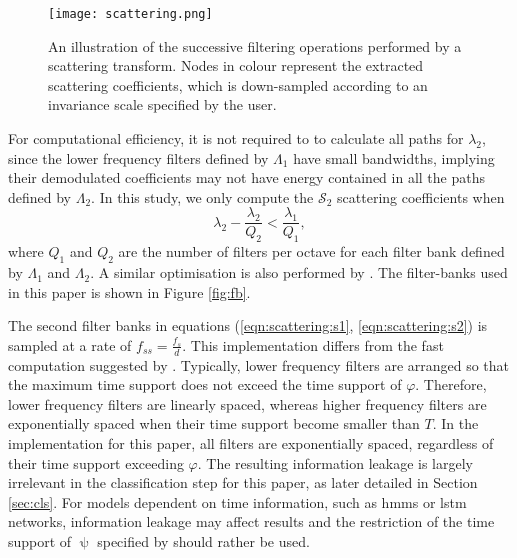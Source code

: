 {\begin{figure}[h]
    \centering
    \texttt{[image: scattering.png]}
    \caption{An illustration of the successive filtering operations performed by a scattering transform. Nodes in colour represent the extracted scattering coefficients, which is down-sampled according to an invariance scale specified by the user.}
    \label{fig:scattering}
\end{figure}

For computational efficiency, it is not required to to calculate all paths for $\lambda_2$, since the lower frequency filters defined by $\Lambda_1$ have small bandwidths, implying their demodulated coefficients may not have energy contained in all the paths defined by $\Lambda_2$. In this study, we only compute the $\mathcal{S}_2$ scattering coefficients when 
\begin{equation}
\label{eqn:restrictlambda2}
    \lambda_2 - \frac{\lambda_2}{Q_2} <  \frac{\lambda_1}{Q_1},
\end{equation}
where $Q_1$ and $Q_2$ are the number of filters per octave for each filter bank defined by $\Lambda_1$ and $\Lambda_2$. A similar optimisation is also performed by \citet{ws_audio}. The filter-banks used in this paper is shown in Figure \ref{fig:fb}.

The second filter banks in equations (\ref{eqn:scattering:s1}, \ref{eqn:scattering:s2}) is sampled at a rate of $f_{ss} = \frac{f_s}{d}$. This implementation differs from the fast computation suggested by \citet{ws_audio}. Typically, lower frequency filters are arranged so that the maximum time support does not exceed the time support of $\varphi$. Therefore, lower frequency filters are linearly spaced, whereas higher frequency filters are exponentially spaced when their time support become smaller than $T$. In the implementation for this paper, all filters are exponentially spaced, regardless of their time support exceeding $\varphi$. The resulting information leakage is largely irrelevant in the classification step for this paper, as later detailed in Section \ref{sec:cls}. For models dependent on time information, such as \acp{hmm} or \ac{lstm} networks, information leakage may affect results and the restriction of the time support of $\uppsi$ specified by \citet{ws_audio} should rather be used.




}
